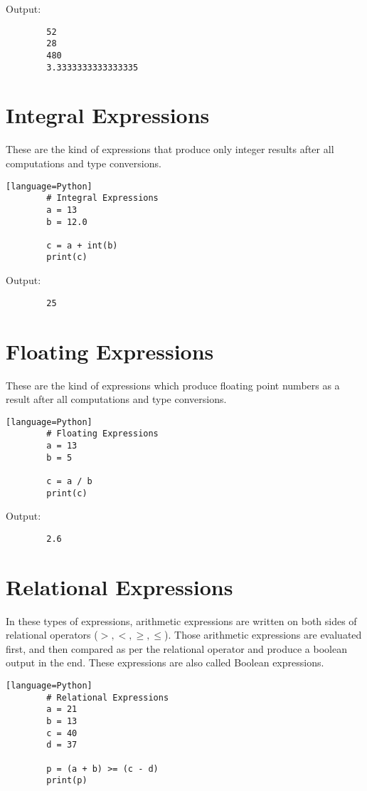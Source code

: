 \documentclass{article}
\begin{document}
	Output:
	\begin{verbatim}
		52
		28
		480
		3.3333333333333335
	\end{verbatim}
	
	\section{Integral Expressions}
	
	These are the kind of expressions that produce only integer results after all computations and type conversions.
	
	\begin{verbatim}[language=Python]
		# Integral Expressions 
		a = 13
		b = 12.0
		
		c = a + int(b) 
		print(c)
	\end{verbatim}
	
	Output:
	\begin{verbatim}
		25
	\end{verbatim}
	
	\section{Floating Expressions}
	
	These are the kind of expressions which produce floating point numbers as a result after all computations and type conversions.
	
	\begin{verbatim}[language=Python]
		# Floating Expressions 
		a = 13
		b = 5
		
		c = a / b 
		print(c)
	\end{verbatim}
	
	Output:
	\begin{verbatim}
		2.6
	\end{verbatim}
	
	\section{Relational Expressions}
	
	In these types of expressions, arithmetic expressions are written on both sides of relational operators ($>, <, \geq, \leq$). Those arithmetic expressions are evaluated first, and then compared as per the relational operator and produce a boolean output in the end. These expressions are also called Boolean expressions.
	
	\begin{verbatim}[language=Python]
		# Relational Expressions 
		a = 21
		b = 13
		c = 40
		d = 37
		
		p = (a + b) >= (c - d) 
		print(p)
	\end{verbatim}
	
\end{document}
